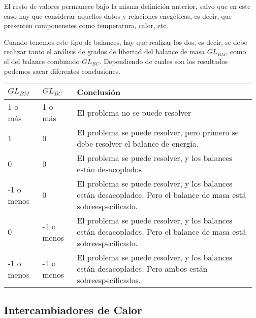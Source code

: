 El resto de valores permanece bajo la misma definición anterior, salvo que en este caso hay que considerar aquellos datos y relaciones enegéticas, es decir, que presenten componenetes como temperatura, calor, etc.

Cuando tenemos este tipo de balances, hay que realizar los dos, es decir, se debe realizar tanto el análisis de grados de libertad del balance de masa $GL_{BM}$, como el del balance combinado $GL_{BC}$.
Dependiendo de cuales son los resultados podemos sacar diferentes conclusiones.

\begin{table}[h]
    \begin{tabular}{|l|l|l|}
    \hline
    $GL_{BM}$  & $GL_{BC}$  & Conclusión                                                                                                        \\ \hline
    1 o más    & 1 o más    & El problema no se puede resolver                                                                                  \\ \hline
    1          & 0          & El problema se puede resolver, pero primero se debe resolver el balance de energía.                               \\ \hline
    0          & 0          & El problema se puede resolver, y los balances están desacoplados.                                                 \\ \hline
    -1 o menos & 0          & El problema se puede resolver, y los balances están desacoplados. Pero el balance de masa está sobreespecificado. \\ \hline
    0          & -1 o menos & El problema se puede resolver, y los balances están desacoplados. Pero el balance de masa está sobreespecificado. \\ \hline
    -1 o menos & -1 o menos & El problema se puede resolver, y los balances están desacoplados. Pero ambos están sobreespecificados.            \\ \hline
    \end{tabular}
\end{table}

\subsection{Intercambiadores de Calor}

